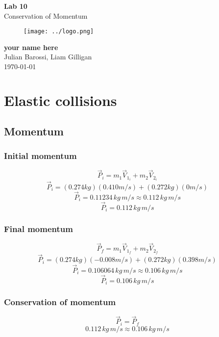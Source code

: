 \documentclass[11pt, letterpaper, includehead]{article}
\begin{document}
\begin{titlepage}
  \begin{center}
    \Huge{\textbf{Lab 10}}\\
    \Huge{Conservation of Momentum}
    \vfill
    \begin{figure}[H] %
      \centering 
      \texttt{[image: ../logo.png]}
    \end{figure}
    \large{\textbf{your name here}}\\
    \large{Julian Barossi, Liam Gilligan}\\
    \vspace{0.5cm}
    \normalsize
    \today
  \end{center}
\end{titlepage}

\tableofcontents
\pagebreak %

\section{Elastic collisions} 
\subsection{Momentum}

\subsubsection{Initial momentum}
$$\vec{P}_i = m_1\vec{V}_{1_i} + m_2\vec{V}_{2_i}$$
$$\vec{P}_i = (0.274kg)(0.410m/s) + (0.272kg)(0m/s)$$
$$\vec{P}_i = 0.11234 \,kg \, m / s \approx 0.112 \,kg \, m / s$$
$$\boxed{\vec{P}_i = 0.112 \,kg \, m / s}$$


\subsubsection{Final momentum}
$$\vec{P}_f = m_1\vec{V}_{1_f} + m_2\vec{V}_{2_f}$$
$$\vec{P}_i = (0.274kg)(-0.008m/s) + (0.272kg)(0.398m/s)$$
$$\vec{P}_i = 0.106064 \,kg \, m / s \approx 0.106 \,kg \, m / s$$
$$\boxed{\vec{P}_i = 0.106 \,kg \, m / s}$$

\subsubsection{Conservation of momentum}
$$\vec{P}_i = \vec{P}_f$$
$$\boxed{0.112\,kg \, m / s \approx 0.106\,kg \, m / s}$$
\end{document}
